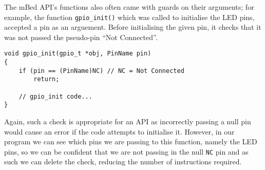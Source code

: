 The mBed API's functions also often came with guards on their arguments; for example, the function \verb|gpio_init()| which was called to initialise the LED pins, accepted a pin as an arguement. Before initialising the given pin, it checks that it was not passed the pseudo-pin ``Not Connected''.

\begin{lstlisting}[caption={Argument Guards of gpio init}]
void gpio_init(gpio_t *obj, PinName pin)
{
    if (pin == (PinName)NC) // NC = Not Connected
        return;

    // gpio_init code...
}
\end{lstlisting}

Again, such a check is appropriate for an API as incorrectly passing a null pin would cause an error if the code attempts to initialise it. However, in our program we can see which pins we are passing to this function, namely the LED pins, so we can be confident that we are not passing in the null \verb|NC| pin and as such we can delete the check, reducing the number of instructions required.

